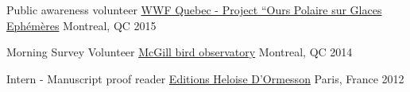 \begin{cventries}
  \vspace{-8pt}
  \cventry
    {Public awareness volunteer} %
    {\href{https://wwf.ca/fr/stories/projet-ours-polaire-limpact-du-rechauffement-sur-les-populations-du-nord/}{WWF Quebec - Project “Ours Polaire sur Glaces Ephémères}} %
    {Montreal, QC} %
    {2015} %
    {}

  \vspace{-8pt}
  \cventry
    {Morning Survey Volunteer} %
    {\href{https://www.oommbo.org/}{McGill bird observatory}} %
    {Montreal, QC} %
    {2014} %
    {}

  \vspace{-8pt}
  \cventry
    {Intern - Manuscript proof reader} %
    {\href{https://www.editis.com/maisons/eho/}{Editions Heloise D’Ormesson}} %
    {Paris, France} %
    {2012} %
    {}

\end{cventries}
\vspace{-12pt}